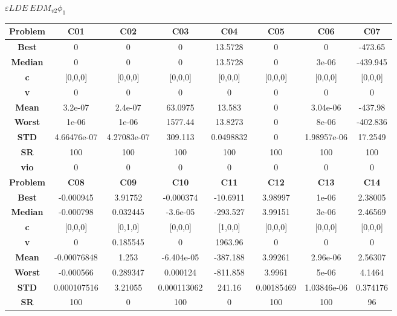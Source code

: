 \documentclass{IEEEtran}
\begin{document}
\begin{center}
$\varepsilon LDE\ EDM_{v2} \phi_1$\\
  \begin{tabular}{|c|c|c|c|c|c|c|c|}
    \hline 
    \textbf{Problem} & \textbf{C01} & \textbf{C02} & \textbf{C03} & \textbf{C04} & \textbf{C05} & \textbf{C06} & \textbf{C07} \\ 
    \hline\hline 
    \textbf{Best} & 0 & 0 & 0 & 13.5728 & 0 & 0 & -473.65\\ 
    \textbf{Median} & 0 & 0 & 0 & 13.5728 & 0 & 3e-06 & -439.945\\ 
    \textbf{c} & [0,0,0] & [0,0,0] & [0,0,0] & [0,0,0] & [0,0,0] & [0,0,0] & [0,0,0]\\ 
    \textbf{v} & 0 & 0 & 0 & 0 & 0 & 0 & 0\\ 
    \textbf{Mean} & 3.2e-07 & 2.4e-07 & 63.0975 & 13.583 & 0 & 3.04e-06 & -437.98\\ 
    \textbf{Worst} & 1e-06 & 1e-06 & 1577.44 & 13.8273 & 0 & 8e-06 & -402.836\\ 
    \textbf{STD} & 4.66476e-07 & 4.27083e-07 & 309.113 & 0.0498832 & 0 & 1.98957e-06 & 17.2549\\ 
    \textbf{SR} & 100 & 100 & 100 & 100 & 100 & 100 & 100\\ 
    \textbf{vio} & 0 & 0 & 0 & 0 & 0 & 0 & 0\\ 
    \hline 
    \hline 
    \textbf{Problem} & \textbf{C08} & \textbf{C09} & \textbf{C10} & \textbf{C11} & \textbf{C12} & \textbf{C13} & \textbf{C14} \\ 
    \hline\hline 
    \textbf{Best} & -0.000945 & 3.91752 & -0.000374 & -10.6911 & 3.98997 & 1e-06 & 2.38005\\ 
    \textbf{Median} & -0.000798 & 0.032445 & -3.6e-05 & -293.527 & 3.99151 & 3e-06 & 2.46569\\ 
    \textbf{c} & [0,0,0] & [0,1,0] & [0,0,0] & [1,0,0] & [0,0,0] & [0,0,0] & [0,0,0]\\ 
    \textbf{v} & 0 & 0.185545 & 0 & 1963.96 & 0 & 0 & 0\\ 
    \textbf{Mean} & -0.00076848 & 1.253 & -6.404e-05 & -387.188 & 3.99261 & 2.96e-06 & 2.56307\\ 
    \textbf{Worst} & -0.000566 & 0.289347 & 0.000124 & -811.858 & 3.9961 & 5e-06 & 4.1464\\ 
    \textbf{STD} & 0.000107516 & 3.21055 & 0.000113062 & 241.16 & 0.00185469 & 1.03846e-06 & 0.374176\\ 
    \textbf{SR} & 100 & 0 & 100 & 0 & 100 & 100 & 96\\ 

\end{tabular}
\end{center}
\end{document}
